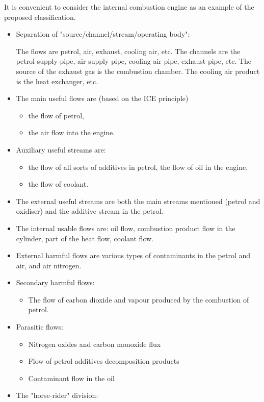 \documentclass[a4paper,11pt]{article}
\begin{document}
It is convenient to consider the internal combustion engine as an example of
the proposed classification.
\begin{itemize}
\item Separation of "source/channel/stream/operating body":

The flows are petrol, air, exhaust, cooling air, etc. The channels are the
petrol supply pipe, air supply pipe, cooling air pipe, exhaust pipe, etc. The
source of the exhaust gas is the combustion chamber. The cooling air product
is the heat exchanger, etc.
\item The main useful flows are (based on the ICE principle)
  \begin{itemize}
  \item the flow of petrol,
  \item the air flow into the engine.
  \end{itemize}
\item Auxiliary useful streams are:
  \begin{itemize}
  \item the flow of all sorts of additives in petrol, the flow of oil in the
    engine, 
  \item the flow of coolant.
  \end{itemize}
\item The external useful streams are both the main streams mentioned (petrol
  and oxidiser) and the additive stream in the petrol.
\item The internal usable flows are: oil flow, combustion product flow in the
  cylinder, part of the heat flow, coolant flow.
\item External harmful flows are various types of contaminants in the petrol
  and air, and air nitrogen.
\item Secondary harmful flows:
  \begin{itemize}
  \item The flow of carbon dioxide and vapour produced by the combustion of
    petrol.
  \end{itemize}
\item Parasitic flows:
  \begin{itemize}
  \item Nitrogen oxides and carbon monoxide flux
  \item Flow of petrol additives decomposition products
  \item Contaminant flow in the oil
  \end{itemize}
\item The "horse-rider" division:

\end{itemize}
\end{document}
